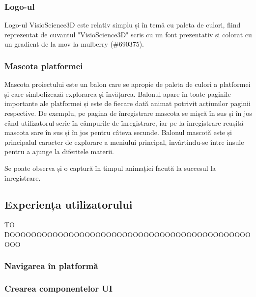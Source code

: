 
\subsubsection{Logo-ul}
Logo-ul VisioScience3D este relativ simplu și în temă cu paleta de culori, fiind reprezentat
de cuvantul "VisioScience3D" scris cu un font prezentativ și colorat cu un gradient de la
mov la mulberry (\#690375).


\newpage
\subsubsection{Mascota platformei}
Mascota proiectului este un balon care se apropie de paleta de culori a platformei
și care simbolizează explorarea și învățarea. Balonul apare în toate paginile importante ale platformei
și este de fiecare dată animat potrivit acțiunilor paginii respective. De exemplu, pe pagina de 
înregistrare mascota se mișcă în sus și în jos când utilizatorul scrie în câmpurile de
înregistrare, iar pe la înregistrare reușită mascota sare în sus și în jos pentru câteva secunde.
Balonul mascotă este și principalul caracter de explorare a meniului principal, învârtindu-se între
insule pentru a ajunge la diferitele materii.


Se poate observa și o captură în timpul animației facută la succesul la înregistrare.


\subsection{Experiența utilizatorului}

TO DOOOOOOOOOOOOOOOOOOOOOOOOOOOOOOOOOOOOOOOOOOOOOOOO
\subsubsection{Navigarea în platformă}
\subsubsection{Crearea componentelor UI}
